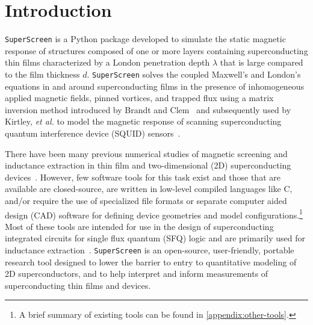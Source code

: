 \documentclass[final,3p,times,twocolumn]{elsarticle}
\newcommand{\inline}[1]{\texttt{#1}\xspace}
\newcommand{\SuperScreen}{\inline{SuperScreen}}
\begin{document}
\begin{small}
\end{small}

\section{Introduction}
\label{section:introduction}

\SuperScreen is a Python package developed to simulate the static magnetic response of structures composed of one or more layers containing superconducting thin films characterized by a London penetration depth $\lambda$ that is large compared to the film thickness $d$. \SuperScreen solves the coupled Maxwell's and London's equations in and around superconducting films in the presence of inhomogeneous applied magnetic fields, pinned vortices, and trapped flux using a matrix inversion method introduced by Brandt and Clem~\cite{Brandt2004-ew,Brandt2005-wj} and subsequently used by Kirtley, \textit{et al.} to model the magnetic response of scanning superconducting quantum interference device (SQUID) sensors~\cite{Kirtley2016-zz, Kirtley2016-gt}.

There have been many previous numerical studies of magnetic screening and inductance extraction in thin film and two-dimensional (2D) superconducting devices~\cite{Jaycox1981-zl, Ketchen1982-at, Ketchen2012-mb, Hildebrandt1995-uw, Khapaev1997-kw, Khapaev2001-xq, Khapaev2001-pw, Khapaev2002-ev,  Babaei_Brojeny2003-la, Brandt2004-ew, Brandt2005-wj, Clem2005-ye, Muller2021-ci, Fourie2011-wl, Fourie2012-gv, Jackman2016-mf}. However, few software tools for this task exist and those that are available are closed-source, are written in low-level compiled languages like C, and/or require the use of specialized file formats or separate computer aided design (CAD) software for defining device geometries and model configurations.\footnote{A brief summary of existing tools can be found in \ref{appendix:other-tools}.} Most of these tools are intended for use in the design of superconducting integrated circuits for single flux quantum (SFQ) logic and are primarily used for inductance extraction~\cite{Gaj1999-ls, Tolpygo2021-jz}. \SuperScreen is an open-source, user-friendly, portable research tool designed to lower the barrier to entry to quantitative modeling of 2D superconductors, and to help interpret and inform measurements of superconducting thin films and devices.
\end{document}
